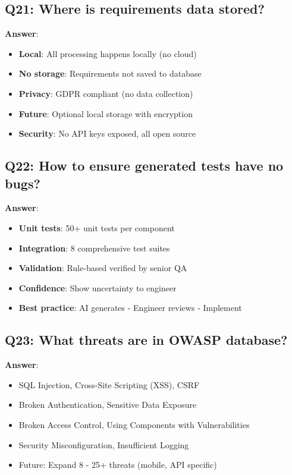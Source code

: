 \documentclass[12pt,a4paper]{report}
\begin{document}
\subsection{Q21: Where is requirements data stored?}

\textbf{Answer}:
\begin{itemize}
    \item \textbf{Local}: All processing happens locally (no cloud)
    \item \textbf{No storage}: Requirements not saved to database
    \item \textbf{Privacy}: GDPR compliant (no data collection)
    \item \textbf{Future}: Optional local storage with encryption
    \item \textbf{Security}: No API keys exposed, all open source
\end{itemize}

\subsection{Q22: How to ensure generated tests have no bugs?}

\textbf{Answer}:
\begin{itemize}
    \item \textbf{Unit tests}: 50+ unit tests per component
    \item \textbf{Integration}: 8 comprehensive test suites
    \item \textbf{Validation}: Rule-based verified by senior QA
    \item \textbf{Confidence}: Show uncertainty to engineer
    \item \textbf{Best practice}: AI generates - Engineer reviews - Implement
\end{itemize}

\subsection{Q23: What threats are in OWASP database?}

\textbf{Answer}:
\begin{itemize}
    \item SQL Injection, Cross-Site Scripting (XSS), CSRF
    \item Broken Authentication, Sensitive Data Exposure
    \item Broken Access Control, Using Components with Vulnerabilities
    \item Security Misconfiguration, Insufficient Logging
    \item Future: Expand 8 - 25+ threats (mobile, API specific)
\end{itemize}
\end{document}
